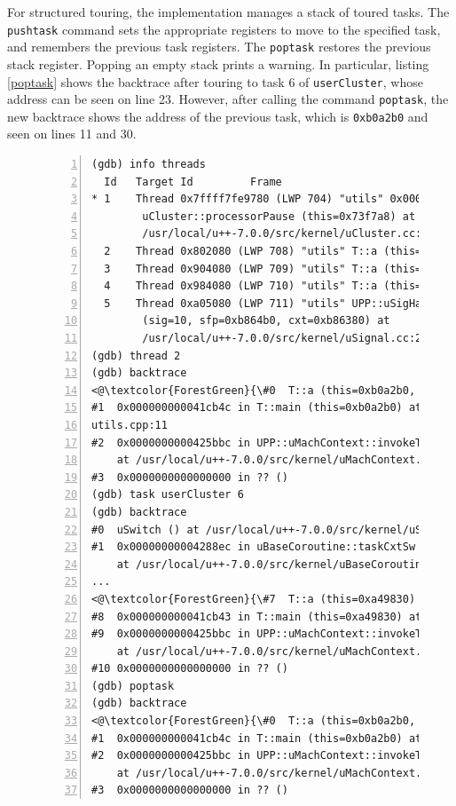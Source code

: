 For structured touring, the implementation manages a stack of toured tasks.
The \verb|pushtask| command sets the appropriate registers to move to the
specified task, and remembers the previous task registers.  The \verb|poptask|
restores the previous stack register. Popping an empty stack prints a warning.
In particular, listing \ref{poptask} shows the backtrace after touring to task
6 of \verb|userCluster|, whose address can be seen on line 23. However, after
calling the command \verb|poptask|, the new backtrace shows the address of the
previous task, which is \verb|0xb0a2b0| and seen on lines 11 and 30.

\begin{figure}
\begin{lstlisting}[numbers=left, caption={\texttt{poptask} command}, label={poptask}, basicstyle=\footnotesize\tt]
(gdb) info threads
  Id   Target Id         Frame
* 1    Thread 0x7ffff7fe9780 (LWP 704) "utils" 0x000000000042f2ef in
        uCluster::processorPause (this=0x73f7a8) at
        /usr/local/u++-7.0.0/src/kernel/uCluster.cc:120
  2    Thread 0x802080 (LWP 708) "utils" T::a (this=0xa49830) at utils.cpp:7
  3    Thread 0x904080 (LWP 709) "utils" T::a (this=0xbcad30) at utils.cpp:7
  4    Thread 0x984080 (LWP 710) "utils" T::a (this=0xb8a9b0) at utils.cpp:7
  5    Thread 0xa05080 (LWP 711) "utils" UPP::uSigHandlerModule::sigAlrmHandler
        (sig=10, sfp=0xb864b0, cxt=0xb86380) at
        /usr/local/u++-7.0.0/src/kernel/uSignal.cc:218
(gdb) thread 2
(gdb) backtrace
<@\textcolor{ForestGreen}{\#0  T::a (this=0xb0a2b0, param=5) at utils.cpp:8}@>
#1  0x000000000041cb4c in T::main (this=0xb0a2b0) at
utils.cpp:11
#2  0x0000000000425bbc in UPP::uMachContext::invokeTask (This=...)
    at /usr/local/u++-7.0.0/src/kernel/uMachContext.cc:140
#3  0x0000000000000000 in ?? ()
(gdb) task userCluster 6
(gdb) backtrace
#0  uSwitch () at /usr/local/u++-7.0.0/src/kernel/uSwitch-x86_64.S:64
#1  0x00000000004288ec in uBaseCoroutine::taskCxtSw (this=0x8c3b78)
    at /usr/local/u++-7.0.0/src/kernel/uBaseCoroutine.cc:146
...
<@\textcolor{ForestGreen}{\#7  T::a (this=0xa49830) at utils.cpp:8}@>
#8  0x000000000041cb43 in T::main (this=0xa49830) at utils.cpp:11
#9  0x0000000000425bbc in UPP::uMachContext::invokeTask (This=...)
    at /usr/local/u++-7.0.0/src/kernel/uMachContext.cc:140
#10 0x0000000000000000 in ?? ()
(gdb) poptask
(gdb) backtrace
<@\textcolor{ForestGreen}{\#0  T::a (this=0xb0a2b0, param=5) at utils.cpp:8}@>
#1  0x000000000041cb4c in T::main (this=0xb0a2b0) at utils.cpp:11
#2  0x0000000000425bbc in UPP::uMachContext::invokeTask (This=...)
    at /usr/local/u++-7.0.0/src/kernel/uMachContext.cc:140
#3  0x0000000000000000 in ?? ()
\end{lstlisting}
\end{figure}

